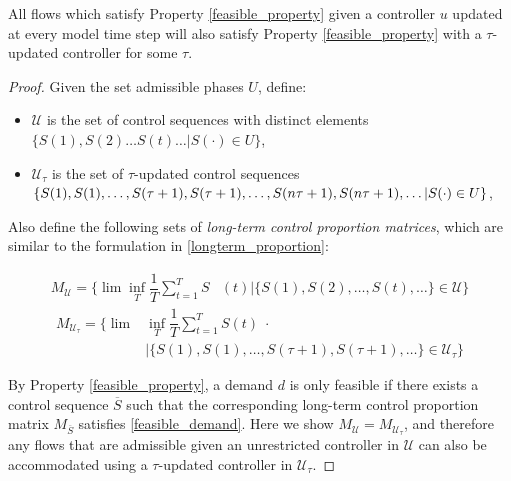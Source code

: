 \label{tauadmissible}
\begin{Lem}
All flows which satisfy Property \ref{feasible_property} given a controller $u$ updated at every model time step will also satisfy Property \ref{feasible_property} with a $\tau$-updated controller for some $\tau$. 
\end{Lem}
\begin{proof}
Given the set admissible phases $U$, define:
\begin{itemize}
\item $\mathcal U$ is the set of control sequences with distinct elements $\{S(1), S(2) \ldots S(t) \ldots |  S(\cdot) \in U\} $,
\item $\mathcal U_{\tau}$ is the set of $\tau$-updated control sequences $\{S(1), S(1), \ldots ,  S(\tau + 1),S(\tau + 1), \ldots , S(n\tau + 1), \\  S(n\tau + 1), \ldots |  S(\cdot) \in U\} $, 
\end{itemize}
Also define the following sets of \emph{long-term control proportion matrices}, which are similar to the formulation in \eqref{longterm_proportion}:
\vspace{-.5em}
\begin{small}
\begin{align*} M_{\mathcal U} = \Big\{\lim \inf_{T}\dfrac{1}{T}\sum_{t=1}^{T}  S&(t)  \Big| \{S(1), S(2), \ldots, S(t), \ldots \}\in \mathcal U \Big\} \end{align*}
\vspace{-1em}
\begin{align*} M_{\mathcal U_\tau} = \Big\{\lim&\inf_{T} \dfrac{1}{T}\sum_{t=1}^{T} S(t) \; \cdot \\ 
& \Big|\{S(1), S(1), \ldots,  S(\tau+1),S(\tau+1), \ldots\}\in \mathcal U_{\tau} \Big\} \end{align*}
\end{small}
By Property \ref{feasible_property}, a demand $d$ is only feasible if there exists a control sequence $\overline {S}$ such that the corresponding long-term control proportion matrix $M_{\overline {S}}$ satisfies \eqref{feasible_demand}. Here we show $M_{\mathcal U} = M_{\mathcal{U_\tau}}$, and therefore any flows that are admissible given an unrestricted controller in $\mathcal U$ can also be accommodated using a $\tau$-updated controller in $\mathcal{U}_\tau$. 


\end{proof}
